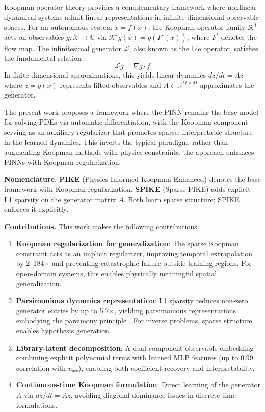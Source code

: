 \documentclass{article}
\theoremstyle{remark}
\begin{document}
Koopman operator theory \citep{koopman1931hamiltonian} provides a complementary framework where nonlinear dynamical systems admit linear representations in infinite-dimensional observable spaces. For an autonomous system $\dot{x} = f(x)$, the Koopman operator family $\mathcal{K}^t$ acts on observables $g: \mathcal{X} \rightarrow \mathbb{C}$ via $\mathcal{K}^t g(x) = g(F^t(x))$, where $F^t$ denotes the flow map. The infinitesimal generator $\mathcal{L}$, also known as the Lie operator, satisfies the fundamental relation \citep{brunton2022modern}:
\begin{equation}
\mathcal{L}g = \nabla g \cdot f
\label{eq:lie_operator}
\end{equation}
In finite-dimensional approximations, this yields linear dynamics $dz/dt = Az$ where $z = g(x)$ represents lifted observables and $A \in \mathbb{R}^{M \times M}$ approximates the generator.

The present work proposes a framework where the PINN remains the base model for solving PDEs via automatic differentiation, with the Koopman component serving as an auxiliary regularizer that promotes sparse, interpretable structure in the learned dynamics. This inverts the typical paradigm: rather than augmenting Koopman methods with physics constraints, the approach enhances PINNs with Koopman regularization.

\textbf{Nomenclature.} \textbf{PIKE} (Physics-Informed Koopman-Enhanced) denotes the base framework with Koopman regularization. \textbf{SPIKE} (Sparse PIKE) adds explicit L1 sparsity on the generator matrix $A$. Both learn sparse structure; SPIKE enforces it explicitly.

\textbf{Contributions.} This work makes the following contributions:
\begin{enumerate}
\item \textbf{Koopman regularization for generalization}: The sparse Koopman constraint acts as an implicit regularizer, improving temporal extrapolation by 2--184$\times$ and preventing catastrophic failure outside training regions. For open-domain systems, this enables physically meaningful spatial generalization.

\item \textbf{Parsimonious dynamics representation}: L1 sparsity reduces non-zero generator entries by up to 5.7$\times$, yielding parsimonious representations embodying the parsimony principle \citep{ma2022principles}. For inverse problems, sparse structure enables hypothesis generation.

\item \textbf{Library-latent decomposition}: A dual-component observable embedding combining explicit polynomial terms with learned MLP features (up to 0.99 correlation with $u_{xx}$), enabling both coefficient recovery and interpretability.

\item \textbf{Continuous-time Koopman formulation}: Direct learning of the generator $A$ via $dz/dt = Az$, avoiding diagonal dominance issues in discrete-time formulations.
\end{enumerate}
\end{document}

